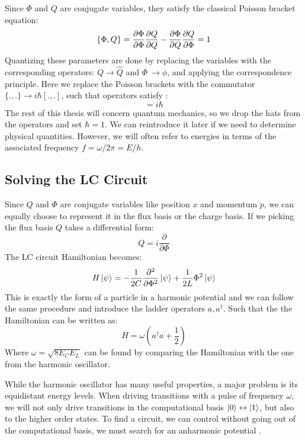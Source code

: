 Since $\Phi$ and $Q$ are conjugate variables, they satisfy the classical Poisson bracket equation:
\begin{equation}
    \{ \Phi, Q\} = \frac{\partial \Phi}{\partial \Phi}\frac{\partial Q}{\partial Q} - \frac{\partial \Phi}{\partial Q}\frac{\partial Q}{\partial \Phi} = 1
\end{equation}
Quantizing these parameters are done by replacing the variables with the corresponding operators: $Q \to \hat{Q}$ and $\Phi \ \to \phi$, and applying the correspondence principle. Here we replace the Poisson brackets with the commutator $\{., .\} \to i\hbar[., .]$, such that operators satisfy \cite{krantz_quantum_2019}:
\begin{equation}
    [\hat{\phi}, \hat{Q}] = i\hbar
\end{equation}
The rest of this thesis will concern quantum mechanics, so we drop the hats from the operators and set $\hbar = 1$. We can reintroduce it later if we need to determine physical quantities. However, we will often refer to energies in terms of the associated frequency $f = \omega/2\pi = E / h$. 

\subsection{Solving the LC Circuit}\label{sec:forming_qubits}
Since $Q$ and $\Phi$ are conjugate variables like position $x$ and momentum $p$, we can equally choose to represent it in the flux basis or the charge basis. If we picking the flux basis $Q$ takes a differential form:
\begin{equation}
    Q = i\frac{\partial}{\partial \Phi}
\end{equation}
The LC circuit Hamiltonian becomes:
\begin{equation}
    H \ket{\psi} = - \frac{1}{2C} \frac{\partial^2 }{\partial \Phi^2}\ket{\psi} + \frac{1}{2L} \Phi^2 \ket{\psi}
\end{equation}
This is exactly the form of a particle in a harmonic potential and we can follow the same procedure and introduce the ladder operators $a, a^\dagger$. Such that the the Hamiltonian can be written as:
\begin{equation}
    H = \omega \left(a^\dagger a + \frac12\right)
\end{equation}
Where $\omega = \sqrt{8 E_C E_L}$ can be found by comparing the Hamiltonian with the one from the harmonic oscillator.

While the harmonic oscillator has many useful properties, a major problem is its equidistant energy levels. When driving transitions with a pulse of frequency $\omega$, we will not only drive transitions in the computational basis $\ket{0} \leftrightarrow\ket{1}$, but also to the higher order states. To find a circuit, we can control without going out of the computational basis, we must search for an anharmonic potential \cite{krantz_quantum_2019}.

